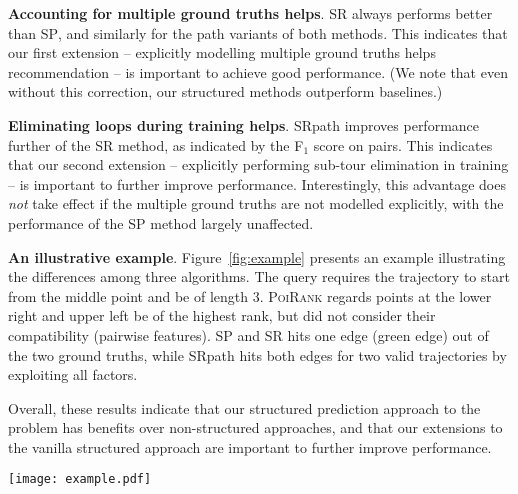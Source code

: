 \textbf{Accounting for multiple ground truths helps}.
\textsc{SR} always performs better than \textsc{SP},
and similarly for the {\sc path} variants of both methods.
This indicates that our first extension -- explicitly modelling multiple ground truths helps recommendation -- is important to achieve good performance.
(We note that even without this correction, our structured methods outperform baselines.)

\textbf{Eliminating loops during training helps}.
{\sc SRpath} improves performance further of the {\sc SR} method,
as indicated by the F$_1$ score on pairs.
This indicates that our second extension -- explicitly performing sub-tour elimination in training -- is important to further improve performance.
Interestingly,
this advantage does \emph{not} take effect if the multiple ground truths are not modelled explicitly,
with the performance of the {\sc SP} method largely unaffected.

\textbf{An illustrative example}. Figure~\ref{fig:example} presents an example illustrating the differences among three algorithms. The query requires the trajectory to start from the middle point and be of length 3.
\textsc{PoiRank} regards points at the lower right and upper left be of the highest rank, but did not consider their compatibility (\ie pairwise features). {\sc SP} and {\sc SR} hits one edge (green edge) out of the two ground truths, while {\sc SRpath} hits both edges for two valid trajectories by exploiting all factors.

Overall, these results indicate that our structured prediction approach to the problem has
benefits over non-structured approaches,
and that our extensions to the vanilla structured approach are important to further improve performance.


\begin{figure*}[t]
	\centering
	\texttt{[image: example.pdf]}
	\caption{Example of structured recommender versus baseline on a query with two ground truths. %
             (a) \textsc{PoiRank} cannot make a recommendation related to any of the ground truths;
             (b) \textsc{SP} and \textsc{SR} recommend a better trajectory than \textsc{PoiRank}, but not fully consistent with the ground truths;
             (c) \textsc{SRpath} hits both ground truths at rank 3 (green edges) and 5 (red edges) respectively.}
	\label{fig:example}
\end{figure*}

